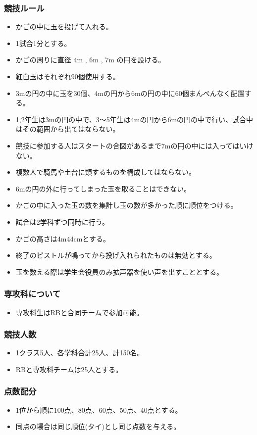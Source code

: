 \documentclass[titlepage]{jarticle}
\begin{document}
   \subsubsection{競技ルール}
    \begin{itemize}
     \item かごの中に玉を投げて入れる。
     \item 1試合1分とする。
     \item かごの周りに直径 4m , 6m , 7m の円を設ける。
     \item 紅白玉はそれぞれ90個使用する。
     \item 3mの円の中に玉を30個、4mの円から6mの円の中に60個まんべんなく配置する。
     \item 1,2年生は3mの円の中で、3～5年生は4mの円から6mの円の中で行い、試合中はその範囲から出てはならない。
     \item 競技に参加する人はスタートの合図があるまで7mの円の中には入ってはいけない。
     \item 複数人で騎馬や土台に類するものを構成してはならない。
     \item 6mの円の外に行ってしまった玉を取ることはできない。
     \item かごの中に入った玉の数を集計し玉の数が多かった順に順位をつける。
     \item 試合は2学科ずつ同時に行う。
     \item かごの高さは4m44cmとする。
     \item 終了のピストルが鳴ってから投げ入れられたものは無効とする。
     \item 玉を数える際は学生会役員のみ拡声器を使い声を出すこととする。
    \end{itemize}
   \subsubsection{専攻科について}
    \begin{itemize}
     \item 専攻科生はRBと合同チームで参加可能。
    \end{itemize}
   \subsubsection{競技人数}
    \begin{itemize}
     \item1クラス5人、各学科合計25人、計150名。
     \item RBと専攻科チームは25人とする。
    \end{itemize}
   \subsubsection{点数配分}
    \begin{itemize}
     \item 1位から順に100点、80点、60点、50点、40点とする。
     \item 同点の場合は同じ順位(タイ)とし同じ点数を与える。
    \end{itemize}
\end{document}
